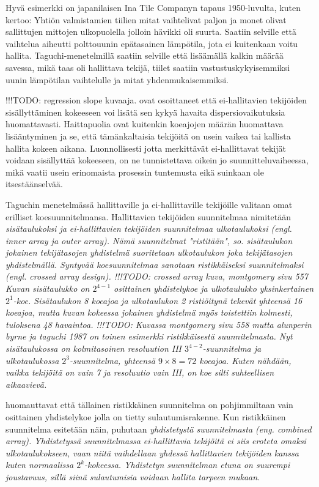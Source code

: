 \documentclass[12pt,a4paper,finnish]{tutthesis}
\newcommand\todo[1]{{\color{red}!!!TODO: #1}} %
\begin{document}
Hyvä esimerkki on japanilaisen Ina Tile Companyn tapaus 1950-luvulta,
kuten \textcite{Kackar1989} kertoo:
Yhtiön valmistamien tiilien mitat vaihtelivat paljon ja monet olivat sallittujen mittojen ulkopuolella
jolloin hävikki oli suurta.
Saatiin selville että vaihtelua aiheutti polttouunin epätasainen lämpötila,
jota ei kuitenkaan voitu hallita. Taguchi-menetelmillä saatiin selville että
lisäämällä kalkin määrää savessa, mikä taas oli hallittava tekijä, tiilet saatiin
vastustuskykyisemmiksi uunin lämpötilan vaihtelulle ja mitat yhdenmukaisemmiksi.

\todo{regression slope kuvaaja}.
\textcite{steinberg1994,Steinberg1998,Berube1998} ovat osoittaneet
että ei-hallitavien tekijöiden sisällyttäminen kokeeseen voi
lisätä sen kykyä havaita dispersiovaikutuksia huomattavasti.
Haittapuolia ovat kuitenkin koeajojen määrän huomattava lisääntyminen
ja se, että tämänkaltaisia tekijöitä on usein vaikea
tai kallista hallita kokeen aikana. Luonnollisesti jotta merkittävät ei-hallittavat
tekijät voidaan sisällyttää kokeeseen, on ne tunnistettava oikein jo
suunnitteluvaiheessa, mikä vaatii usein erinomaista prosessin tuntemusta
eikä suinkaan ole itsestäänselvää.

Taguchin menetelmässä hallittaville ja ei-hallittaville
tekijöille valitaan omat erilliset koesuunnitelmansa.
Hallittavien tekijöiden suunnitelmaa nimitetään \em sisätaulukoksi \em
ja ei-hallittavien tekijöiden suunnitelmaa \em ulkotaulukoksi \em
(engl. inner array ja outer array).
Nämä suunnitelmat
"ristitään", so. sisätaulukon jokainen tekijätasojen yhdistelmä
suoritetaan ulkotaulukon joka tekijätasojen yhdistelmällä. Syntyvää
koesuunnitelmaa sanotaan \em ristikkäiseksi suunnitelmaksi \em
(engl. crossed array design). \todo{crossed array kuva, montgomery sivu 557}
Kuvan sisätaulukko on \(2^{4-1}\) osittainen yhdistelykoe ja ulkotaulukko
yksinkertainen \(2^1\)-koe. Sisätaulukon 8 koeajoa ja ulkotaulukon 2
ristiöitynä tekevät yhteensä 16 koeajoa, mutta kuvan kokeessa jokainen
yhdistelmä myös toistettiin kolmesti, tuloksena 48 havaintoa.
\todo{Kuvassa montgomery sivu 558 mutta alunperin byrne ja taguchi 1987}
on toinen esimerkki ristikkäisestä suunnitelmasta. Nyt sisätaulukossa
on kolmitasoinen resoluution III \(3^{4-2}\)-suunnitelma ja ulkotaulukossa \(2^3\)-suunnitelma,
yhteensä \(9\times 8=72\) koeajoa. Kuten nähdään, vaikka tekijöitä on vain
7 ja resoluutio vain III, on koe silti suhteellisen aikaavievä.

\textcite{shoemaker1991} huomauttavat että tällainen ristikkäinen
suunnitelma on pohjimmiltaan vain osittainen yhdistelykoe jolla
on tietty sulautumisrakenne. Kun ristikkäinen suunnitelma esitetään
näin, puhutaan \em yhdistetystä suunnitelmasta \em (eng. combined
array). Yhdistetyssä suunnitelmassa ei-hallittavia
tekijöitä ei siis eroteta omaksi ulkotaulukokseen, vaan niitä vaihdellaan yhdessä hallittavien
tekijöiden kanssa kuten normaalissa \(2^k\)-kokeessa.
Yhdistetyn suunnitelman etuna on suurempi joustavuus, sillä siinä sulautumisia
voidaan hallita tarpeen mukaan.
\end{document}
